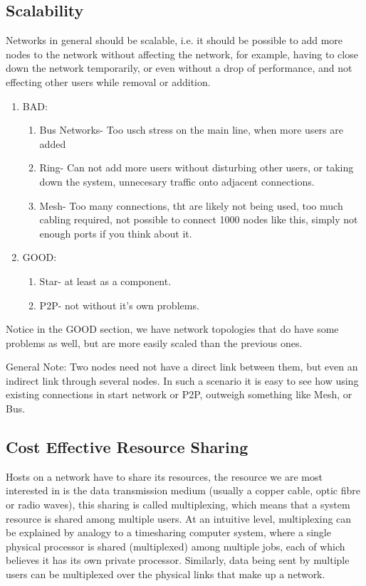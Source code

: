 \documentclass[12pt]{book}
\begin{document}
\subsection{Scalability}
Networks in general should be scalable, i.e. it should be possible to add more nodes to the network without affecting the network, for example, having to close down the network temporarily, or even without a drop of performance, and not effecting other users while removal or addition.
\begin{enumerate}
    \item BAD:
    \begin{enumerate}
        \item Bus Networks- Too usch stress on the main line, when more users are added
        \item Ring- Can not add more users without disturbing other users, or taking down the system, unnecesary traffic onto adjacent connections.
        \item Mesh- Too many connections, tht are likely not being used, too much cabling required, not possible to connect 1000 nodes like this, simply not enough ports if you think about it.
    \end{enumerate}
    \item GOOD:
    \begin{enumerate}
        \item Star- at least as a component.
        \item P2P- not without it's own problems.
    \end{enumerate}
\end{enumerate}
Notice in the GOOD section, we have network topologies that do have some problems as well, but are more easily scaled than the previous ones.

General Note: Two nodes need not have a direct link between them, but even an indirect link through several nodes. In such a scenario it is easy to see how using existing connections in start network or P2P, outweigh something like Mesh, or Bus. 

\subsection{Cost Effective Resource Sharing}
Hosts on a network have to share its resources, the resource we are most interested in is the data transmission medium (usually a copper cable, optic fibre or radio waves), this sharing is called multiplexing, which means that a system resource is shared among multiple users. At an intuitive level, multiplexing can be explained by analogy to a timesharing computer system, where a single physical processor is shared (multiplexed) among multiple jobs, each of which believes it has its own private processor. Similarly, data being sent by multiple users can be multiplexed over the physical links that make up a network.
\end{document}

